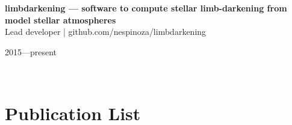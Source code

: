 \documentclass[12pt, a4paper]{article} %
\begin{document}
\begin{minipage}[t]{0.7\textwidth}
\begin{flushleft}%
  \setlength{\leftskip}{0.2cm}%
\textbf{limbdarkening --- software to compute stellar limb-darkening from model stellar atmospheres}\\
Lead developer | github.com/nespinoza/limbdarkening
\end{flushleft}
\end{minipage}
\begin{minipage}[t]{0.3\textwidth}
\hfill 2015---present
\end{minipage}\\

\section*{Publication List}
\end{document}
